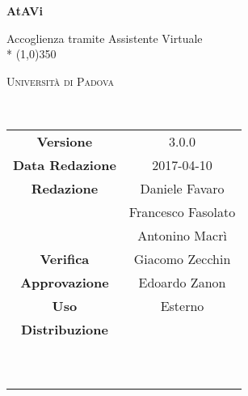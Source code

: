 \documentclass[a4paper,12pt]{article}
\author{Daniele Favaro, Francesco Fasolato}
\date{2017-04-10}
\begin{document}
	\begin{titlepage}
		\centering
		{\huge\bfseries AtAVi\par}
		Accoglienza tramite Assistente Virtuale \\*
		\line(1,0){350} \\
		{\scshape\LARGE Università di Padova \par}
		\vspace{1cm}
		{\scshape\Large \pianodiqualificaRQ\ \par}
		\logo
		\newpage
		\begin{tabular}{c|c}
			{\hfill\textbf{Versione}} 				& 3.0.0				\\
			{\hfill\textbf{Data Redazione}} 	& 2017-04-10 		\\
			{\hfill\textbf{Redazione}} 			& Daniele Favaro \\ & Francesco Fasolato \\ & Antonino Macrì \\
			{\hfill\textbf{Verifica}} 				& Giacomo Zecchin				\\
			{\hfill\textbf{Approvazione}} 		& Edoardo Zanon				\\
			{\hfill\textbf{Uso}} 						& Esterno 					\\
			{\hfill\textbf{Distribuzione}} 		& \vardanega\ \\ & \cardin\ \\ & \prop\ \\
		\end{tabular}
	\end{titlepage}
	
	\pagestyle{myfront}
	\newpage
		
	
	\newpage
		\tableofcontents 	%
	\newpage
		\listoftables 		%
	
	\label{LastFrontPage}
	
	\newpage	
	\pagestyle{mymain}
		
	\newpage	
		
	\newpage	
		
	\newpage	
		
		
	\label{LastPage}
\end{document}

